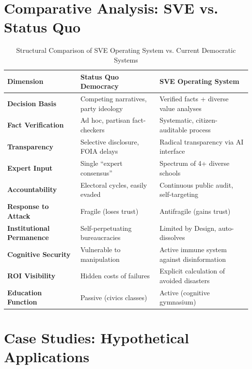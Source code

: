 \documentclass[11pt,a4paper]{article}
\begin{document}
\begin{small}



\clearpage
\appendix

\section{Comparative Analysis: SVE vs. Status Quo}
\label{app:comparison}

\begin{table}[h!]
\centering
\caption{Structural Comparison of SVE Operating System vs. Current Democratic Systems}
\label{tab:comparison}
\begin{tabular}{@{}p{4cm}p{5cm}p{5cm}@{}}
\toprule
\textbf{Dimension} & \textbf{Status Quo Democracy} & \textbf{SVE Operating System} \\
\midrule
\textbf{Decision Basis} & Competing narratives, party ideology & Verified facts + diverse value analyses \\
\addlinespace
\textbf{Fact Verification} & Ad hoc, partisan fact-checkers & Systematic, citizen-auditable process \\
\addlinespace
\textbf{Transparency} & Selective disclosure, FOIA delays & Radical transparency via AI interface \\
\addlinespace
\textbf{Expert Input} & Single ``expert consensus'' & Spectrum of 4+ diverse schools \\
\addlinespace
\textbf{Accountability} & Electoral cycles, easily evaded & Continuous public audit, self-targeting \\
\addlinespace
\textbf{Response to Attack} & Fragile (loses trust) & Antifragile (gains trust) \\
\addlinespace
\textbf{Institutional Permanence} & Self-perpetuating bureaucracies & Limited by Design, auto-dissolves \\
\addlinespace
\textbf{Cognitive Security} & Vulnerable to manipulation & Active immune system against disinformation \\
\addlinespace
\textbf{ROI Visibility} & Hidden costs of failures & Explicit calculation of avoided disasters \\
\addlinespace
\textbf{Education Function} & Passive (civics classes) & Active (cognitive gymnasium) \\
\bottomrule
\end{tabular}
\end{table}

\section{Case Studies: Hypothetical Applications}
\label{app:casestudies}


\end{small}
\end{document}

